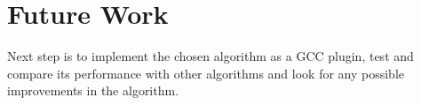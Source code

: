 \chapter{Future Work}

Next step is to implement the chosen algorithm as a GCC plugin, test and compare its performance with other algorithms and look for any possible improvements in the algorithm.
